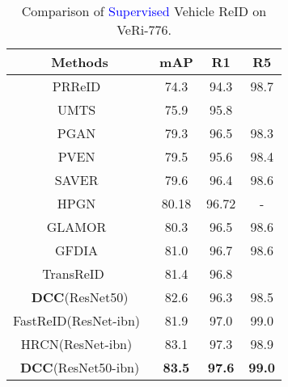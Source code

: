 \documentclass[10pt,twocolumn,letterpaper]{article}
\begin{document}
\begin{table}
\footnotesize
\begin{center}
\begin{threeparttable}
\begin{tabular}{c|ccc}
\toprule
Methods           & mAP& R1 & R5 \\
\midrule
PRReID~\cite{he2019part} & 74.3 & 94.3 &98.7\\
UMTS~\cite{jin2020uncertainty} & 75.9 & 95.8 & \\
PGAN~\cite{zhang2019part} & 79.3 & 96.5 &98.3\\
PVEN~\cite{meng2020parsing} & 79.5 & 95.6 &98.4\\
SAVER~\cite{khorramshahi2020devil} & 79.6 & 96.4 &98.6\\
HPGN~\cite{DBLP:journals/corr/abs-2005-14684} & 80.18 & 96.72& - \\
GLAMOR~\cite{suprem2020looking} & 80.3 & 96.5 &98.6\\
GFDIA~\cite{DBLP:conf/iccv/Li0Z21} &  81.0 & 96.7 & 98.6 \\
TransReID~\cite{He_2021_ICCV}~\tnote{*} &81.4&96.8\\
\textbf{DCC}(ResNet50) &82.6&96.3&98.5\\
\midrule
FastReID(ResNet-ibn)~\cite{he2020fastreid} & 81.9 & 97.0 & 99.0 \\
HRCN(ResNet-ibn)~\cite{DBLP:conf/iccv/ZhaoZ0Y021} & 83.1& 97.3 & 98.9 \\
\textbf{DCC}(ResNet50-ibn) &\textbf{83.5}&\textbf{97.6}&\textbf{99.0}\\
\bottomrule
\end{tabular}
\end{threeparttable}
\caption{\small Comparison of  \textcolor{blue}{Supervised} Vehicle ReID on VeRi-776.}
\label{tab:supervised_veri}
\end{center}
\end{table}
\end{document}
